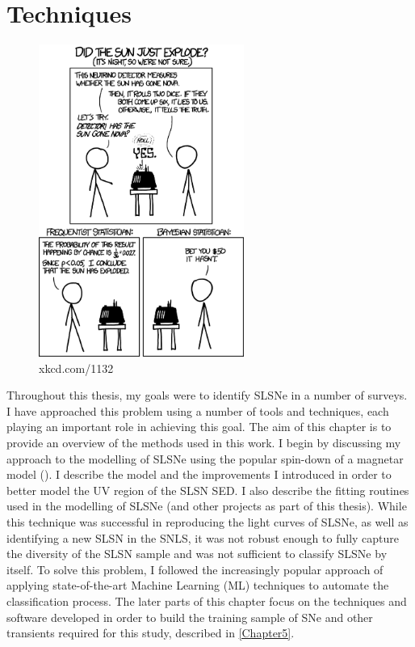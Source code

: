 \chapter{Techniques}
\label{Chapter3}

\begin{figure}[H]
  \centering
  \includegraphics[width=0.6\textwidth]{Figures/xkcd/chapter3.png}
  \caption*{xkcd.com/1132}
\end{figure}

Throughout this thesis, my goals were to identify SLSNe in a number of surveys. I have approached this problem using a number of tools and techniques, each playing an important role in achieving this goal. The aim of this chapter is to provide an overview of the methods used in this work. I begin by discussing my approach to the modelling of SLSNe using the popular spin-down of a magnetar model (). I describe the model and the improvements I introduced in order to better model the UV region of the SLSN SED. I also describe the fitting routines used in the modelling of SLSNe (and other projects as part of this thesis). While this technique was successful in reproducing the light curves of SLSNe, as well as identifying a new SLSN in the SNLS, it was not robust enough to fully capture the diversity of the SLSN sample and was not sufficient to classify SLSNe by itself. To solve this problem, I followed the increasingly popular approach of applying state-of-the-art Machine Learning (ML) techniques to automate the classification process. The later parts of this chapter focus on the techniques and software developed in order to build the training sample of SNe and other transients required for this study, described in \cref{Chapter5}.

